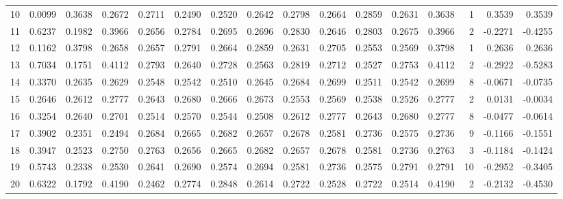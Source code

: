 \begin{tabular}{lrrrrrrrrrrrrrrr}
10  &      0.0099 &  0.3638 &  0.2672 &  0.2711 &  0.2490 &  0.2520 &  0.2642 &  0.2798 &  0.2664 &  0.2859 &   0.2631 &     0.3638 &      1 &                    0.3539 &                     0.3539 \\
11  &      0.6237 &  0.1982 &  0.3966 &  0.2656 &  0.2784 &  0.2695 &  0.2696 &  0.2830 &  0.2646 &  0.2803 &   0.2675 &     0.3966 &      2 &                   -0.2271 &                    -0.4255 \\
12  &      0.1162 &  0.3798 &  0.2658 &  0.2657 &  0.2791 &  0.2664 &  0.2859 &  0.2631 &  0.2705 &  0.2553 &   0.2569 &     0.3798 &      1 &                    0.2636 &                     0.2636 \\
13  &      0.7034 &  0.1751 &  0.4112 &  0.2793 &  0.2640 &  0.2728 &  0.2563 &  0.2819 &  0.2712 &  0.2527 &   0.2753 &     0.4112 &      2 &                   -0.2922 &                    -0.5283 \\
14  &      0.3370 &  0.2635 &  0.2629 &  0.2548 &  0.2542 &  0.2510 &  0.2645 &  0.2684 &  0.2699 &  0.2511 &   0.2542 &     0.2699 &      8 &                   -0.0671 &                    -0.0735 \\
15  &      0.2646 &  0.2612 &  0.2777 &  0.2643 &  0.2680 &  0.2666 &  0.2673 &  0.2553 &  0.2569 &  0.2538 &   0.2526 &     0.2777 &      2 &                    0.0131 &                    -0.0034 \\
16  &      0.3254 &  0.2640 &  0.2701 &  0.2514 &  0.2570 &  0.2544 &  0.2508 &  0.2612 &  0.2777 &  0.2643 &   0.2680 &     0.2777 &      8 &                   -0.0477 &                    -0.0614 \\
17  &      0.3902 &  0.2351 &  0.2494 &  0.2684 &  0.2665 &  0.2682 &  0.2657 &  0.2678 &  0.2581 &  0.2736 &   0.2575 &     0.2736 &      9 &                   -0.1166 &                    -0.1551 \\
18  &      0.3947 &  0.2523 &  0.2750 &  0.2763 &  0.2656 &  0.2665 &  0.2682 &  0.2657 &  0.2678 &  0.2581 &   0.2736 &     0.2763 &      3 &                   -0.1184 &                    -0.1424 \\
19  &      0.5743 &  0.2338 &  0.2530 &  0.2641 &  0.2690 &  0.2574 &  0.2694 &  0.2581 &  0.2736 &  0.2575 &   0.2791 &     0.2791 &     10 &                   -0.2952 &                    -0.3405 \\
20  &      0.6322 &  0.1792 &  0.4190 &  0.2462 &  0.2774 &  0.2848 &  0.2614 &  0.2722 &  0.2528 &  0.2722 &   0.2514 &     0.4190 &      2 &                   -0.2132 &                    -0.4530 \\

\end{tabular}
